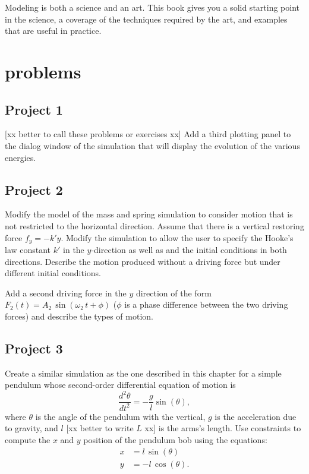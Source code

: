 Modeling is both a science and an art. This book gives you a solid starting point in the science, a coverage of the techniques required by the art, and examples that are useful in practice.

\section{problems}\label{section:02Projects}

\subsection*{Project 1} [xx better to call these problems or exercises xx]
Add a third plotting panel to the dialog window of the  simulation that will display the evolution of the various energies.

\subsection*{Project 2}
Modify the model of the mass and spring simulation to consider motion that is not restricted to the horizontal direction.  Assume that there is a vertical restoring force $f_y=-k' y$. Modify the simulation to allow the user to specify the Hooke's law constant $k'$ in the $y$-direction as well as and the initial conditions in both directions. Describe the motion produced without a driving force but under different initial conditions.

Add a second driving force in the $y$ direction of the form $F_2(t)=A_2\,\sin(\omega_2\, t + \phi)$ ($\phi$ is a phase difference between the two driving forces) and describe the types of motion.

\subsection*{Project 3}
Create a similar simulation as the one described in this chapter for a simple pendulum whose second-order differential equation of motion is
\begin{equation}
  \frac{d^2\theta}{dt^2} = -\frac{g}{l} \sin (\theta),
\end{equation}
where $\theta$ is the angle of the pendulum with the vertical, $g$ is the acceleration due to gravity, and $l$ [xx better to write $L$ xx] is the arms's length. Use constraints to compute the $x$ and $y$ position of the pendulum bob using the equations:
\begin{align*}
   x   &=  l \, \sin (\theta) \\
   y   &= -l \, \cos (\theta).
\end{align*}

